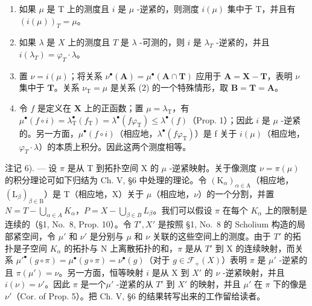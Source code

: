 \begin{enumerate}
\def\labelenumi{\alph{enumi})}
\item
  如果 \(\mu\) 是 T 上的测度且 \(i\) 是 \(\mu\) -逆紧的，则测度 \(i(\mu)\) 集中于 T，并且有 \((i(\mu))_{T} = \mu\)。
\item
  如果 \(\lambda\) 是 \(X\) 上的测度且 \(T\) 是 \(\lambda\) -可测的，则 \(i\) 是 \(\lambda_{T}\) -逆紧的，并且 \(i(\lambda_T) = \varphi_T \cdot \lambda\)。
\item
  置 \(\nu = i(\mu)\)；将关系 \(\nu^{\bullet}(\mathbf{A}) = \mu^{\bullet}(\mathbf{A} \cap \mathbf{T})\) 应用于 \(\mathbf{A} = \mathbf{X} - \mathbf{T}\)，表明 \(\nu\) 集中于 \(\mathbf{T}\)。关系 \(\nu_{\mathrm{T}} = \mu\) 是关系 (2) 的一个特殊情形，取 \(\mathbf{B} = \mathbf{T} = \mathbf{A}\)。
\item
  令 \(f\) 是定义在 \(\mathbf{X}\) 上的正函数；置 \(\mu = \lambda_{\mathrm{T}}\)，有 \(\mu^{\bullet}(f \circ i) = \lambda_{\mathrm{T}}^{\bullet}(f_{\mathrm{T}}) = \lambda^{\bullet}(f\varphi_{\mathrm{T}}) \leqslant \lambda^{\bullet}(f)\)（Prop. 1）；因此 \(i\) 是 \(\mu\) -逆紧的。另一方面，\(\mu^{\bullet}(f \circ i)\)（相应地，\(\lambda^{\bullet}(f\varphi_{\mathrm{T}})\)）是 f 关于 \(i(\mu)\)（相应地，\(\varphi_{T} \cdot \lambda\)）的本质上积分。因此这两个测度相等。
\end{enumerate}

注记 6). --- 设 \(\pi\) 是从 T 到拓扑空间 X 的 \(\mu\) -逆紧映射。关于像测度 \(\nu = \pi(\mu)\) 的积分理论可如下归结为 Ch. V, §6 中处理的理论。令 \((\mathrm{K}_{\alpha})_{\alpha \in \mathrm{A}}\)（相应地，\((\mathrm{L}_{\beta})_{\beta \in \mathrm{B}}\)）是 T（相应地，X）关于 \(\mu\)（相应地，\(\nu\)）的一个分割，并置 \(N = T - \bigcup_{\alpha \in A} K_{\alpha}\)，\(P = X - \bigcup_{\beta \in B} L_{\beta}\)。我们可以假设 \(\pi\) 在每个 \(K_{\alpha}\) 上的限制是连续的（§1, No.~8, Prop. 10）。令 \(T', X'\) 是按照 §1, No.~8 的 Scholium 构造的局部紧空间，令 \(\mu'\) 和 \(\nu'\) 是分别与 \(\mu\) 和 \(\nu\) 关联的这些空间上的测度。由于 \(T'\) 的拓扑是子空间 \(K_{\alpha}\) 的拓扑与 N 上离散拓扑的和，\(\pi\) 是从 \(T'\) 到 X 的连续映射，而关系 \(\mu'^{\bullet}(g \circ \pi) = \mu^{\bullet}(g \circ \pi) = \nu^{\bullet}(g)\)（对于 \(g \in \mathcal{F}_{+}(X)\)）表明 \(\pi\) 是 \(\mu'\) -逆紧的且 \(\pi(\mu') = \nu\)。另一方面，恒等映射 \(i\) 是从 X 到 \(X'\) 的 \(\nu\) -逆紧映射，并且 \(i(\nu) = \nu'\)。因此 \(\pi\) 是一个\(\mu'\) -逆紧的从 \(T'\) 到 \(X'\) 的映射，并且 \(\mu'\) 在 \(\pi\) 下的像是 \(\nu'\)（Cor. of Prop. 5）。把 Ch. V, §6 的结果转写出来的工作留给读者。


